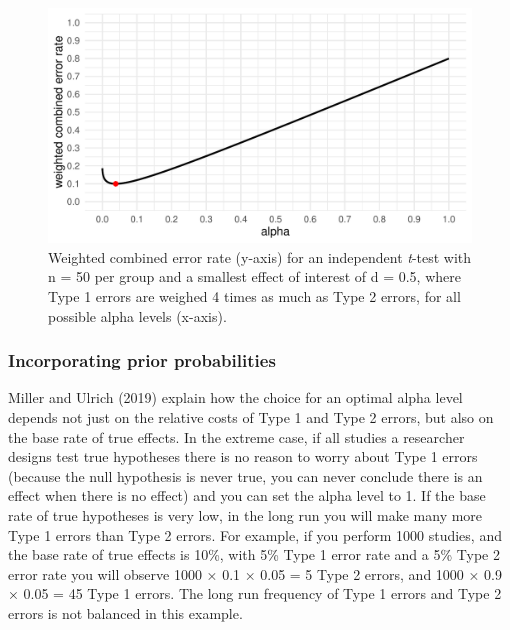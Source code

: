\documentclass[,jou,floatsintext]{apa6}
\begin{document}
\begin{figure}
\centering
\includegraphics{Justify_in_Practice_files/figure-latex/cost-plot-1.pdf}
\caption{\label{fig:cost-plot}Weighted combined error rate (y-axis) for an independent \emph{t}-test with n = 50 per group and a smallest effect of interest of d = 0.5, where Type 1 errors are weighed 4 times as much as Type 2 errors, for all possible alpha levels (x-axis).}
\end{figure}

\hypertarget{incorporating-prior-probabilities}{%
\subsubsection{Incorporating prior probabilities}\label{incorporating-prior-probabilities}}

Miller and Ulrich (2019) explain how the choice for an optimal alpha level depends not just on the relative costs of Type 1 and Type 2 errors, but also on the base rate of true effects. In the extreme case, if all studies a researcher designs test true hypotheses there is no reason to worry about Type 1 errors (because the null hypothesis is never true, you can never conclude there is an effect when there is no effect) and you can set the alpha level to 1. If the base rate of true hypotheses is very low, in the long run you will make many more Type 1 errors than Type 2 errors. For example, if you perform 1000 studies, and the base rate of true effects is 10\%, with 5\% Type 1 error rate and a 5\% Type 2 error rate you will observe 1000 × 0.1 × 0.05 = 5 Type 2 errors, and 1000 × 0.9 × 0.05 = 45 Type 1 errors. The long run frequency of Type 1 errors and Type 2 errors is not balanced in this example.
\end{document}
